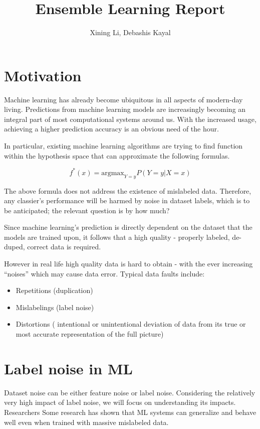 \documentclass{article}
\author{Xining Li, Debashis Kayal}
\title {Ensemble Learning Report}
\date{}
\begin{document}
\maketitle

\section{Motivation}

Machine learning has already become ubiquitous in all aspects of modern-day living. Predictions from machine learning models are increasingly becoming an integral part of most computational systems around us. With the increased usage, achieving a higher prediction accuracy is an obvious need of the hour. 


In particular, existing machine learning algorithms are trying to find function within the hypothesis space that can approximate the following formulas.

\begin{equation}
    f^*(x) = {\mathrm {argmax}}_{Y=y} P (Y=y|X=x)
\end{equation}

The above formula does not address the existence of mislabeled data. Therefore, any classier's performance will be harmed by noise in dataset labels, which is to be anticipated; the relevant question is by how much?

Since machine learning’s prediction is directly dependent on the dataset that the models are trained upon, it follows that a high quality - properly labeled, de-duped, correct data is required. 

However in real life high quality data is hard to obtain - with the ever increasing “noises” which may cause data error. Typical data faults include: 

\begin{itemize}
    \item Repetitions (duplication)
    \item Mislabelings (label noise)
    \item Distortions ( intentional or unintentional deviation of data from its true or most accurate representation of the full picture)
\end{itemize}

\section{Label noise in ML}

Dataset noise can be either feature noise or label noise. Considering the relatively very high impact of label noise, we will focus on understanding its impacts.
Researchers 
Some research \cite{rolnick_veit_belongie_shavit_2018} has shown that ML systems can generalize and behave well even when trained with massive mislabeled data. 
\end{document}

